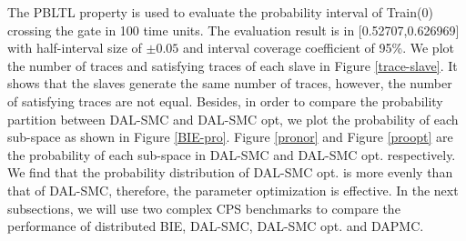 The PBLTL property is used to evaluate the probability interval of Train(0) crossing the gate in 100 time units. The evaluation result is in [0.52707,0.626969] with half-interval size of $\pm0.05$ and interval coverage coefficient of 95\%. We plot the number of traces and satisfying traces of each slave in Figure \ref{trace-slave}. It shows that the slaves generate the same number of traces, however, the number of satisfying traces are not equal. Besides, in order to compare the probability partition between DAL-SMC and DAL-SMC opt, we plot the probability of each sub-space as shown in Figure \ref{BIE-pro}. Figure \ref{pronor} and Figure \ref{proopt} are the probability of each sub-space in DAL-SMC and DAL-SMC opt. respectively. We find that the probability distribution of DAL-SMC opt. is more evenly than that of DAL-SMC, therefore, the parameter optimization is effective. In the next subsections, we will use two complex CPS benchmarks to compare the performance of distributed BIE, DAL-SMC, DAL-SMC opt. and DAPMC.
\begin{figure}[htbp]
\end{figure}

